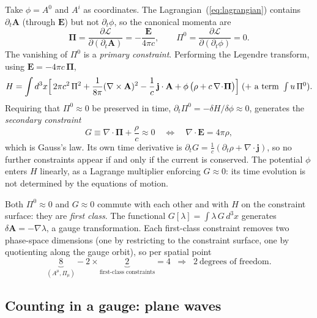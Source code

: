 \documentclass[11pt,a4paper]{book}
\begin{document}
Take $\phi=A^0$ and $A^i$ as coordinates. The Lagrangian~(\ref{eq:lagrangian}) contains
$\partial_t\mathbf A$ (through $\mathbf E$) but not $\partial_t\phi$, so the canonical momenta are
\begin{equation}
\boldsymbol\Pi=\frac{\partial\mathcal L}{\partial(\partial_t\mathbf A)}=-\frac{\mathbf E}{4\pi c},
\qquad
\Pi^0=\frac{\partial\mathcal L}{\partial(\partial_t\phi)}=0 .
\label{eq:momenta}
\end{equation}
The vanishing of $\Pi^0$ is a \emph{primary constraint}. Performing the Legendre
transform, using $\mathbf E=-4\pi c\,\boldsymbol\Pi$,
\begin{equation}
H=\int d^3x\Bigl[\,2\pi c^2\,\Pi^2+\frac1{8\pi}(\nabla\times\mathbf A)^2
-\frac1c\,\mathbf j\cdot\mathbf A+\phi\,\bigl(\rho+c\,\nabla\!\cdot\!\boldsymbol\Pi\bigr)\Bigr]
\;(+\text{ a term }\textstyle\int u\,\Pi^0 ).
\label{eq:hamiltonian}
\end{equation}
Requiring that $\Pi^0\approx0$ be preserved in time, $\partial_t\Pi^0=-\delta H/\delta\phi\approx0$,
generates the \emph{secondary constraint}
\begin{equation}
G\equiv\nabla\cdot\boldsymbol\Pi+\frac\rho c\approx0
\quad\Longleftrightarrow\quad
\nabla\cdot\mathbf E=4\pi\rho ,
\label{eq:gauss-constraint}
\end{equation}
which is Gauss's law. Its own time derivative is
$\partial_tG=\frac1c(\partial_t\rho+\nabla\cdot\mathbf j)$, so no further constraints appear
if and only if the current is conserved. The potential $\phi$ enters $H$ linearly, as a
Lagrange multiplier enforcing $G\approx0$: its time evolution is not determined by the
equations of motion.

Both $\Pi^0\approx0$ and $G\approx0$ commute with each other and with $H$ on the constraint
surface: they are \emph{first class}. The functional $G[\lambda]=\int\lambda\,G\,d^3x$ generates
$\delta\mathbf A=-\nabla\lambda$, a gauge transformation. Each first-class constraint removes
two phase-space dimensions (one by restricting to the constraint surface, one by quotienting
along the gauge orbit), so per spatial point
\begin{equation}
\underbrace{8}_{(A^\mu,\Pi_\mu)}-2\times\underbrace{2}_{\text{first-class constraints}}=4
\;\;\Longrightarrow\;\;2\ \text{degrees of freedom}.
\end{equation}

\subsection{Counting in a gauge: plane waves}
\end{document}
